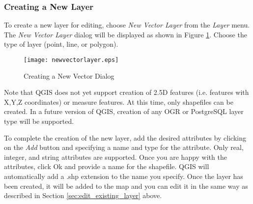 
\subsubsection{Creating a New Layer}

To create a new layer for editing, choose \textit{New Vector Layer} from the
\textit{Layer} menu. The \textit{New Vector Layer} dialog will be displayed as
shown in Figure \ref{fig:newvectorlayer}. Choose the type of layer (point,
line, or polygon). 

\begin{figure}[ht]
   \begin{center}
   \caption{Creating a New Vector Dialog}\label{fig:newvectorlayer}\smallskip
   \texttt{[image: newvectorlayer.eps]}
\end{center} 
\end{figure}

Note that QGIS does not yet support creation of 2.5D
features (i.e. features with X,Y,Z coordinates) or measure features. At this
time, only shapefiles can be created. In a future version of QGIS, creation of
any OGR or PostgreSQL layer type will be supported.

To complete the creation of the new layer, add the desired attributes by
clicking on the \textit{Add} button and specifying a name and type for the
attribute. Only real, integer, and string attributes are supported. Once you
are happy with the attributes, click Ok and provide a name for the shapefile.
QGIS will automatically add a .shp extension to the name you specify.  Once
the layer has been created, it will be added to the map and you can edit it in
the same way as described in Section \ref{sec:edit_existing_layer} above. 
